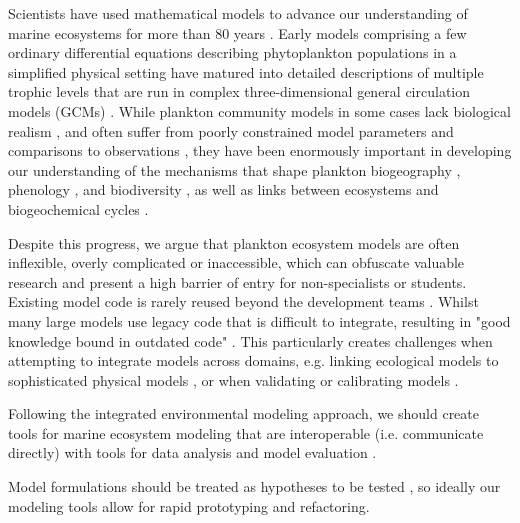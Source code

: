 \documentclass[journal abbreviation, manuscript]{copernicus}
\begin{document}
Scientists have used mathematical models to advance our understanding of marine ecosystems for more than 80 years \citep{Sverdrup1953OnPhytoplankton, Fasham1990a, Follows2007EmergentOcean, Acevedo-Trejos2016, Gentleman2002a}. Early models comprising a few ordinary differential equations describing phytoplankton populations in a simplified physical setting \citep{Evans1985ACycles, Fasham1990a} have matured into detailed descriptions of multiple trophic levels that are run in complex three-dimensional general circulation models (GCMs) \citep[e.g.][]{Dutkiewicz2020DimensionsDiversity}. While plankton community models in some cases lack biological realism \citep{Smith2014}, and often suffer from poorly constrained model parameters and comparisons to observations \citep{Anderson2005}, they have been enormously important in developing our understanding of the mechanisms that shape plankton biogeography \citep[e.g.][]{Follows2007EmergentOcean}, phenology \citep[e.g.][]{Taylor1993SeasonalNitrogen}, and biodiversity \citep[e.g.][]{Barton2010b, Acevedo-Trejos2015c}, as well as links between ecosystems and biogeochemical cycles \citep[e.g.][]{Fasham1990a, Sarmiento1998SimulatedWarming, Dutkiewicz2009}.

Despite this progress, we argue that plankton ecosystem models are often inflexible, overly complicated or inaccessible, which can obfuscate valuable research and present a high barrier of entry for non-specialists or students. Existing model code is rarely reused beyond the development teams \citep{Belete2017AnTesting}. Whilst many large models use legacy code that is difficult to integrate, resulting in "good knowledge bound in outdated code" \citep{Argent2004AnSemantics}. This particularly creates challenges when attempting to integrate models across domains, e.g. linking ecological models to sophisticated physical models \citep{Koralewski2019CouplingModels}, or when validating or calibrating models \citep{Steenbeek2021MakingPerspective}. 

Following the integrated environmental modeling approach, we should create tools for marine ecosystem modeling that are interoperable (i.e. communicate directly) with tools for data analysis and model evaluation \citep{Laniak2013IntegratedFuture}. 

Model formulations should be treated as hypotheses to be tested \citep{Franks2009}, so ideally our modeling tools allow for rapid prototyping and refactoring. 
\end{document}
